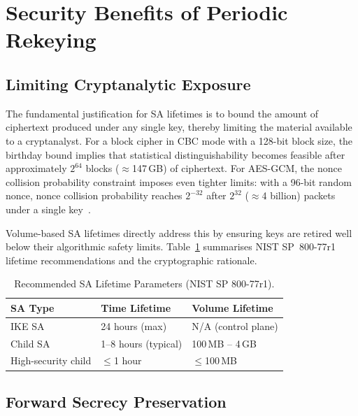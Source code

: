 \documentclass[sigconf,nonacm]{acmart}
\begin{document}
\section{Security Benefits of Periodic Rekeying}
\label{sec:security}

\subsection{Limiting Cryptanalytic Exposure}

The fundamental justification for SA lifetimes is to bound the amount of ciphertext
produced under any single key, thereby limiting the material available to a
cryptanalyst. For a block cipher in CBC mode with a 128-bit block size, the birthday
bound implies that statistical distinguishability becomes feasible after approximately
$2^{64}$ blocks ($\approx$147\,GB) of ciphertext. For AES-GCM, the nonce collision
probability constraint imposes even tighter limits: with a 96-bit random nonce,
nonce collision probability reaches $2^{-32}$ after $2^{32}$ ($\approx$4 billion)
packets under a single key~\cite{rfc4106}.

Volume-based SA lifetimes directly address this by ensuring keys are retired well
below their algorithmic safety limits. Table~\ref{tab:lifetime_guidance} summarises
NIST SP~800-77r1 lifetime recommendations and the cryptographic rationale.

\begin{table}[h]
\caption{Recommended SA Lifetime Parameters (NIST SP 800-77r1).}
\label{tab:lifetime_guidance}
\small
\begin{tabularx}{\columnwidth}{@{}p{1.6cm}X X@{}}
\toprule
\textbf{SA Type} & \textbf{Time Lifetime} & \textbf{Volume Lifetime} \\
\midrule
IKE SA    & 24 hours (max) & N/A (control plane) \\
Child SA  & 1--8 hours (typical) & 100\,MB -- 4\,GB \\
High-security child & $\leq$1 hour & $\leq$100\,MB \\
\bottomrule
\end{tabularx}
\end{table}

\subsection{Forward Secrecy Preservation}
\end{document}
